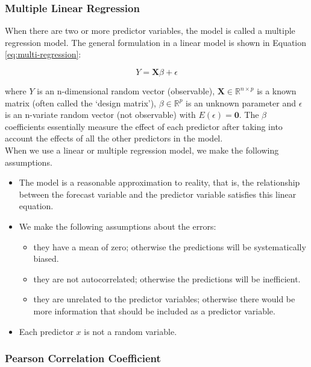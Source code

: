 \subsubsection{Multiple Linear Regression}

When there are two or more predictor variables, the model is called a multiple regression model. The general formulation in a linear model is shown in Equation \ref{eq:multi-regression}:

\begin{equation}
    Y = \mathbf{X}\beta + \epsilon
    \label{eq:multi-regression}
\end{equation}

where $Y$ is an n-dimensional random vector (observable), $\mathbf{X} \in \mathbb{R} ^{n \times p}$ is a known matrix (often called the `design matrix'), $\beta \in \mathbb{R}^p$ is an unknown parameter and $\epsilon$ is an n-variate random vector (not observable) with $E(\epsilon) = \mathbf{0}$. The $\beta$ coefficients essentially measure the effect of each predictor after taking into account the effects of all the other predictors in the model. \\

When we use a linear or multiple regression model, we make the following assumptions.

\begin{itemize}
    \item The model is a reasonable approximation to reality, that is, the relationship between the forecast variable and the predictor variable satisfies this linear equation.
    \item We make the following assumptions about the errors:
    \begin{itemize}
        \item they have a mean of zero; otherwise the predictions will be systematically biased.
        \item they are not autocorrelated; otherwise the predictions will be inefficient.
        \item they are unrelated to the predictor variables; otherwise there would be more information that should be included as a predictor variable.
    \end{itemize}
    \item Each predictor $x$ is not a random variable.
\end{itemize}

\subsubsection{Pearson Correlation Coefficient}

